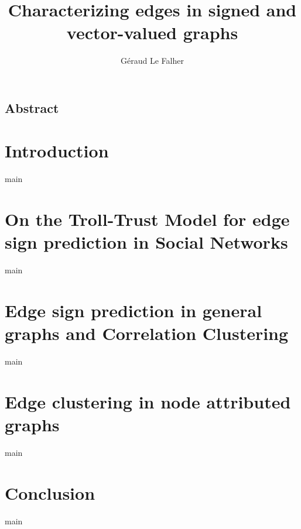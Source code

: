 \documentclass[a4paper,svgnames,twoside,onecolumn,final,titlepage,11pt]{report}
\title{Characterizing edges in signed and vector-valued graphs}
\author{Géraud Le Falher}
\begin{document}

\maketitle

\section*{Abstract}


\tableofcontents
\newpage



\chapter{Introduction}
{main}

\chapter{On the Troll-Trust Model for edge sign prediction in Social Networks}
{main}

\chapter{Edge sign prediction in general graphs and Correlation Clustering}
{main}

\chapter{Edge clustering in node attributed graphs}
{main}

\chapter{Conclusion}
{main}

\vspace{\baselineskip}
\begingroup
{}
\setlength\bibitemsep{1pt}
\todos
\printbibliography
\restoregeometry
\endgroup
\end{document}
